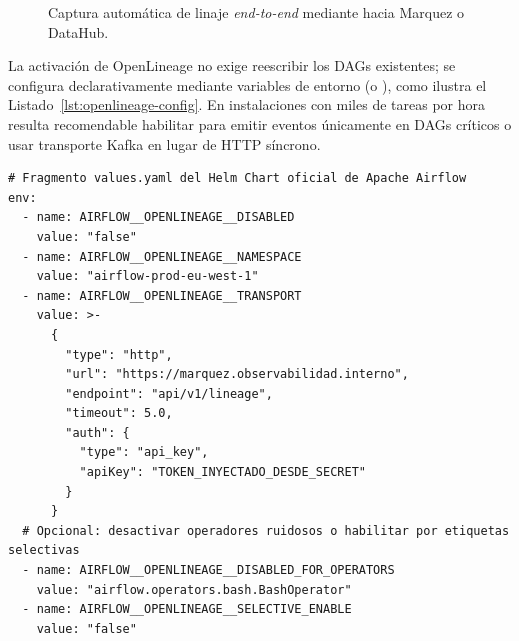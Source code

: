 \begin{figure}[htbp]
{%
}
\caption{Captura automática de linaje \textit{end-to-end} mediante  hacia Marquez o DataHub.}
\label{fig:openlineage-end-to-end}
\end{figure}

La activación de OpenLineage no exige reescribir los DAGs existentes; se configura declarativamente mediante variables de entorno (o ), como ilustra el Listado~\ref{lst:openlineage-config}. En instalaciones con miles de tareas por hora resulta recomendable habilitar  para emitir eventos únicamente en DAGs críticos o usar transporte Kafka en lugar de HTTP síncrono.

\begin{lstlisting}[style=yaml, caption={Configuración de OpenLineage en el Helm Chart de Airflow (variables de entorno hacia Marquez/DataHub).}, label={lst:openlineage-config}]
# Fragmento values.yaml del Helm Chart oficial de Apache Airflow
env:
  - name: AIRFLOW__OPENLINEAGE__DISABLED
    value: "false"
  - name: AIRFLOW__OPENLINEAGE__NAMESPACE
    value: "airflow-prod-eu-west-1"
  - name: AIRFLOW__OPENLINEAGE__TRANSPORT
    value: >-
      {
        "type": "http",
        "url": "https://marquez.observabilidad.interno",
        "endpoint": "api/v1/lineage",
        "timeout": 5.0,
        "auth": {
          "type": "api_key",
          "apiKey": "TOKEN_INYECTADO_DESDE_SECRET"
        }
      }
  # Opcional: desactivar operadores ruidosos o habilitar por etiquetas selectivas
  - name: AIRFLOW__OPENLINEAGE__DISABLED_FOR_OPERATORS
    value: "airflow.operators.bash.BashOperator"
  - name: AIRFLOW__OPENLINEAGE__SELECTIVE_ENABLE
    value: "false"
\end{lstlisting}

